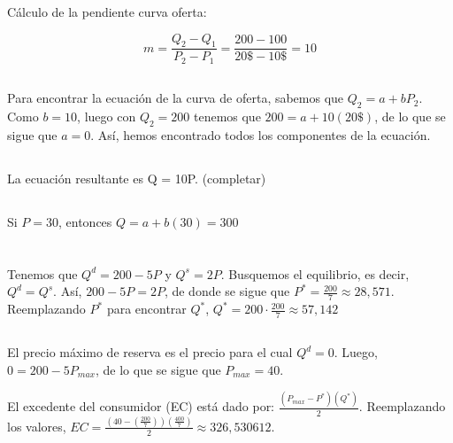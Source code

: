 \documentclass[11pt,a4paper]{article} %
\begin{document}
\noindent Cálculo de la pendiente curva oferta:

$$
m = \frac{Q_{2}-Q_{1}}{P_{2}-P_{1}} = \frac{200-100}{20\$-10\$} = 10
$$

\subsection{}

\noindent Para encontrar la ecuación de la curva de oferta, sabemos que $Q_{2} = a + bP_{2}$. Como $b=10$, luego con $Q_{2} = 200$ tenemos que $200 = a + 10(20\$)$, de lo que se sigue que $a = 0$. Así, hemos encontrado todos los componentes de la ecuación. 

\subsection{}

\noindent La ecuación resultante es Q = 10P. (completar)

\subsection{}

\noindent Si $P = 30$, entonces $Q=a+b(30)=300$

\section{}

\subsection{} 

\noindent Tenemos que $Q^{d} = 200 - 5P$ y $Q^{s} = 2P$. Busquemos el equilibrio, es decir, $Q^{d} = Q^{s}$. Así, $200 - 5P = 2P$, de donde se sigue que $P^* = \frac{200}{7} \approx 28,571$. Reemplazando $P^*$ para encontrar $Q^*$, $Q^* = 200 \cdot \frac{200}{7} \approx 57,142$ 

\subsection{} 

\noindent El precio máximo de reserva es el precio para el cual $Q^d=0$. Luego, $0=200-5P_{max}$, de lo que se sigue que $P_{max} = 40$.

El excedente del consumidor (EC) está dado por: $\frac{(P_{max}-P^*)(Q^*)}{2}$. Reemplazando los valores, $EC = \frac{(40-(\frac{200}{7}))(\frac{400}{7})}{2} \approx 326,530612$.
\end{document}
